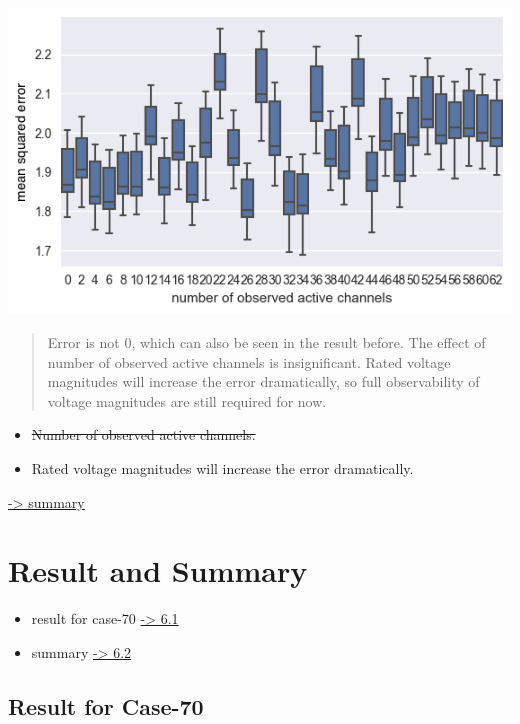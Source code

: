 \documentclass[
]{book}
\providecommand{\tightlist}{%
  \setlength{\itemsep}{0pt}\setlength{\parskip}{0pt}}
\begin{document}
\begin{center}\includegraphics{Pictures/figErrorObsBRM} \end{center}

\begin{quote}
Error is not 0, which can also be seen in the result before.
The effect of number of observed active channels is insignificant.
Rated voltage magnitudes will increase the error dramatically, so full
observability of voltage magnitudes are still required for now.
\end{quote}

\begin{itemize}
\tightlist
\item
  \sout{Number of observed active channels.}
\item
  Rated voltage magnitudes will increase the error dramatically.
\end{itemize}

\protect\hyperlink{summary}{-\textgreater{} summary}

\hypertarget{result-and-summary}{%
\chapter{Result and Summary}\label{result-and-summary}}

\begin{itemize}
\tightlist
\item
  result for case-70 \protect\hyperlink{result}{-\textgreater{} 6.1}
\item
  summary \protect\hyperlink{summary}{-\textgreater{} 6.2}
\end{itemize}

\hypertarget{result}{%
\section{Result for Case-70}\label{result}}
\end{document}
